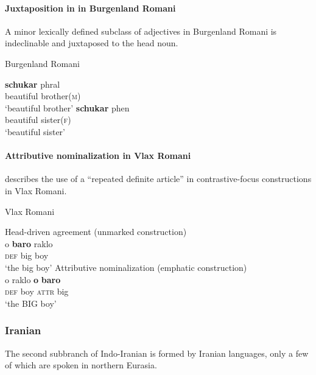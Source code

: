 \paragraph{Juxtaposition in in Burgenland Romani}
A minor lexically defined subclass of adjectives in Burgenland Romani is indeclinable and juxtaposed to the head noun.
\begin{exe}
\ex \rm{Burgenland Romani \citep[22–23]{halwachs-etal2002}}
\begin{xlist}
\ex 
\gll	\textbf{schukar} phral\\
	beautiful brother(\textsc{m})\\
\glt	‘beautiful brother’
\ex
\gll	\textbf{schukar} phen\\
	beautiful sister(\textsc{f})\\
\glt	‘beautiful sister’
\end{xlist}
\end{exe}

\paragraph{Attributive nominalization in Vlax Romani}
\citet{hancock1995} describes the use of a “repeated definite article” in contrastive-focus constructions in Vlax Romani. 
\begin{exe}
\ex \rm{Vlax Romani \citep[30]{hancock1995}}
\begin{xlist}
\ex \rm{Head-driven agreement (unmarked construction)}\\
\gll	o \textbf{baro} raklo\\
	\textsc{def}	big	boy\\
\glt ‘the big boy’
\ex \rm{Attributive nominalization (emphatic construction)}\\
\gll	o raklo \textbf{o} \textbf{baro}\\
	\textsc{def}	{boy}	\textsc{attr} big\\
\glt	‘the BIG boy’
\end{xlist}
\end{exe}

\subsubsection{Iranian}\label{iranian synchr}
The second subbranch of Indo-Iranian is formed by Iranian languages, only a few of which are spoken in northern Eurasia.

